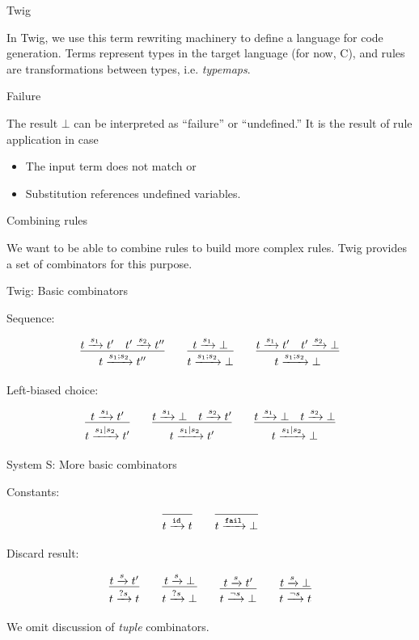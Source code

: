 \documentclass{beamer}
\newcommand{\arr}[1]{\ensuremath\xrightarrow{#1}}
\begin{document}
\begin{frame}{Twig}

In Twig, we use this term rewriting machinery to define a language for code
generation. Terms represent types in the target language (for now, C), and
rules are transformations between types, i.e. \emph{typemaps}.

\end{frame}


\begin{frame}{Failure}

The result $\bot$ can be interpreted as ``failure'' or ``undefined.'' It is
the result of rule application in case

\begin{itemize}
  \item The input term does not match or
  \item Substitution references undefined variables.
\end{itemize}

\end{frame}


\begin{frame}{Combining rules}

We want to be able to combine rules to build more complex rules. Twig provides
a set of combinators for this purpose.

\end{frame}


\begin{frame}{Twig: Basic combinators}

Sequence:

\[
\infer{t \arr{s_1;s_2} t''}{t \arr{s_1} t' \quad t' \arr{s_2} t''}
\qquad 
\infer{t \arr{s_1;s_2} \bot}{t \arr{s_1} \bot}
\qquad
\infer{t \arr{s_1;s_2} \bot}{t \arr{s_1} t' \quad t' \arr{s_2} \bot}
\]

Left-biased choice:

\[
\infer{t \arr{s_1|s_2} t'}{t \arr{s_1} t'}
\qquad 
\infer{t \arr{s_1|s_2} t'}{t \arr{s_1} \bot \quad t \arr{s_2} t'}
\qquad
\infer{t \arr{s_1|s_2} \bot}{t \arr{s_1} \bot \quad t \arr{s_2} \bot}
\]

\end{frame}


\begin{frame}{System S: More basic combinators}

Constants:

\[
\infer{t \arr{\mathtt{id}} t}{}
\qquad
\infer{t \arr{\mathtt{fail}} \bot}{}
\]

Discard result:

\[
\infer{t \arr{?s} t}{t \arr{s} t'}
\qquad 
\infer{t \arr{?s} \bot}{t \arr{s} \bot}
\qquad
\infer{t \arr{\lnot s} \bot}{t \arr{s} t'}
\qquad 
\infer{t \arr{\lnot s} t}{t \arr{s} \bot}
\]

\small{We omit discussion of \emph{tuple} combinators.}

\end{frame}
\end{document}
